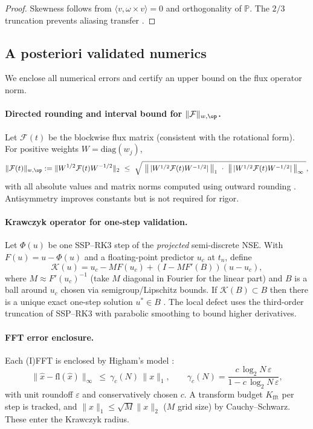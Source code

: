 \IfFileExists{nyjm.cls}{\documentclass[11pt]{nyjm}}{\documentclass[11pt]{amsart}}
\theoremstyle{plain}
\theoremstyle{definition}
\theoremstyle{remark}
\begin{document}
\begin{proof}
Skewness follows from $\langle v,\omega\times v\rangle=0$ and orthogonality of $\mathbb P$. The $2/3$ truncation prevents aliasing transfer \cite{Orszag1971,CanutoQuarteroniHussainiZang2006}.
\end{proof}

\subsection{A posteriori validated numerics}\label{subsec:cav-validated}
We enclose all numerical errors and certify an upper bound on the flux operator norm.

\paragraph{Directed rounding and interval bound for $\|\mathcal F\|_{w,\op}$.}
Let $\mathcal F(t)$ be the blockwise flux matrix (consistent with the rotational form). For positive weights $W=\mathrm{diag}(w_j)$,
\begin{equation}\label{eq:op-bound}
\|\mathcal F(t)\|_{w,\op}:=\|W^{1/2}\mathcal F(t)W^{-1/2}\|_2
\ \le\ \sqrt{\ \big\|\,|W^{1/2}\mathcal F(t)W^{-1/2}|\,\big\|_1\ \cdot\ \big\|\,|W^{1/2}\mathcal F(t)W^{-1/2}|\,\big\|_\infty\ },
\end{equation}
with all absolute values and matrix norms computed using outward rounding \cite{Neumaier1990,Rump1999}. Antisymmetry improves constants but is not required for rigor.

\paragraph{Krawczyk operator for one-step validation.}
Let $\Phi(u)$ be one SSP–RK3 step of the \emph{projected} semi-discrete NSE. With $F(u)=u-\Phi(u)$ and a floating-point predictor $u_c$ at $t_n$, define
\[
\mathcal K(u)=u_c - M F(u_c) + (I-M F'(B))(u-u_c),
\]
where $M\approx F'(u_c)^{-1}$ (take $M$ diagonal in Fourier for the linear part) and $B$ is a ball around $u_c$ chosen via semigroup/Lipschitz bounds. If $\mathcal K(B)\subset B$ then there is a unique exact one-step solution $u^\ast\in B$ \cite{Neumaier1990,Rump1999,Tucker2011}. The local defect uses the third-order truncation of SSP–RK3 with parabolic smoothing to bound higher derivatives.

\paragraph{FFT error enclosure.}
Each (I)FFT is enclosed by Higham’s model \cite[Thm.~22.1]{Higham2002}:
\[
\|\widehat{x}-\mathrm{fl}(\widehat{x})\|_\infty \ \le\ \gamma_c(N)\,\|x\|_1,\qquad
\gamma_c(N)=\frac{c\,\log_2 N\,\varepsilon}{1-c\,\log_2 N\,\varepsilon},
\]
with unit roundoff $\varepsilon$ and conservatively chosen $c$. A transform budget $K_{\mathrm{fft}}$ per step is tracked, and $\|x\|_1\le \sqrt{M}\|x\|_2$ ($M$ grid size) by Cauchy--Schwarz. These enter the Krawczyk radius.
\end{document}
